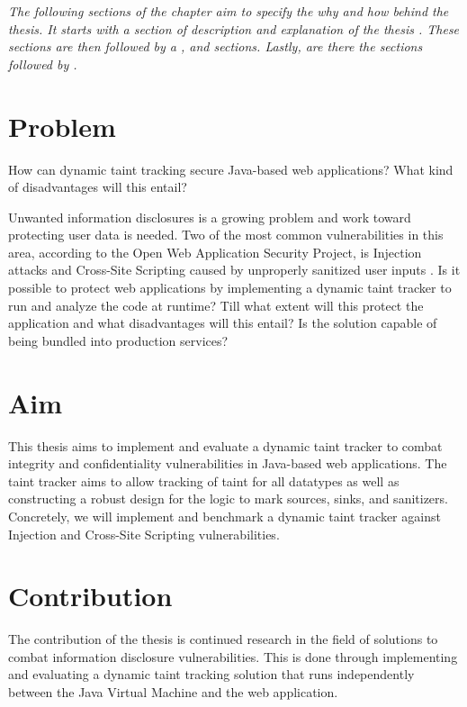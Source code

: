 \textit{The following sections of the chapter aim to specify the why and how behind the thesis. It starts with a section of \textit{} description and explanation of the thesis \textit{}. These sections are then followed by a \textit{}, \textit{} and \textit{} sections. Lastly, are there the sections \textit{} followed by \textit{}.}



\section{Problem}
\label{Problem}
\begin{chapquote}{}
    How can dynamic taint tracking secure Java-based web applications? What kind of disadvantages will this entail?
\end{chapquote}

\noindent
Unwanted information disclosures is a growing problem and work toward protecting user data is needed. Two of the most common vulnerabilities in this area, according to the Open Web Application Security Project, is Injection attacks and Cross-Site Scripting caused by unproperly sanitized user inputs \parencite{OWASP2017}. Is it possible to protect web applications by implementing a dynamic taint tracker to run and analyze the code at runtime? Till what extent will this protect the application and what disadvantages will this entail? Is the solution capable of being bundled into production services?



\section{Aim}
\label{Aim}
This thesis aims to implement and evaluate a dynamic taint tracker to combat integrity and confidentiality vulnerabilities in Java-based web applications. The taint tracker aims to allow tracking of taint for all datatypes as well as constructing a robust design for the logic to mark sources, sinks, and sanitizers. Concretely, we will implement and benchmark a dynamic taint tracker against Injection and Cross-Site Scripting vulnerabilities. 



\section{Contribution}
\label{Contribution}
The contribution of the thesis is continued research in the field of solutions to combat information disclosure vulnerabilities. This is done through implementing and evaluating a dynamic taint tracking solution that runs independently between the Java Virtual Machine and the web application. 



